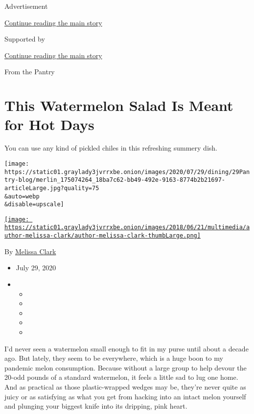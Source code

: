 Advertisement

\protect\hyperlink{after-top}{Continue reading the main story}

Supported by

\protect\hyperlink{after-sponsor}{Continue reading the main story}

From the Pantry

\hypertarget{this-watermelon-salad-is-meant-for-hot-days}{%
\section{This Watermelon Salad Is Meant for Hot
Days}\label{this-watermelon-salad-is-meant-for-hot-days}}

You can use any kind of pickled chiles in this refreshing summery dish.

\texttt{[image: https://static01.graylady3jvrrxbe.onion/images/2020/07/29/dining/29Pantry-blog/merlin\_175074264\_18ba7c62-bb49-492e-9163-8774b2b21697-articleLarge.jpg?quality=75\\\&auto=webp\\\&disable=upscale]}

\href{https://www.nytimes3xbfgragh.onion/by/melissa-clark}{\texttt{[image: https://static01.graylady3jvrrxbe.onion/images/2018/06/21/multimedia/author-melissa-clark/author-melissa-clark-thumbLarge.png]}}

By \href{https://www.nytimes3xbfgragh.onion/by/melissa-clark}{Melissa
Clark}

\begin{itemize}
\item
  July 29, 2020
\item
  \begin{itemize}
  \item
  \item
  \item
  \item
  \item
  \end{itemize}
\end{itemize}

I'd never seen a watermelon small enough to fit in my purse until about
a decade ago. But lately, they seem to be everywhere, which is a huge
boon to my pandemic melon consumption. Because without a large group to
help devour the 20-odd pounds of a standard watermelon, it feels a
little sad to lug one home. And as practical as those plastic-wrapped
wedges may be, they're never quite as juicy or as satisfying as what you
get from hacking into an intact melon yourself and plunging your biggest
knife into its dripping, pink heart.

